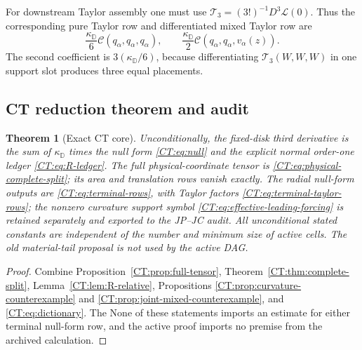 \documentclass[11pt]{amsart}
\numberwithin{equation}{section}
\newtheorem{theorem}{Theorem}[section]
\theoremstyle{definition}
\theoremstyle{remark}
\newcommand{\Cnull}{\mathcal C}
\begin{document}
For downstream Taylor assembly one must use
$\mathcal T_3=(3!)^{-1}D^3\mathcal L(0)$.  Thus the corresponding pure
Taylor row and differentiated mixed Taylor row are
\begin{equation}\label{CT:eq:terminal-taylor-rows}
 \boxed{
 \frac{\kappa_{\mathbb D}}6
   \Cnull(q_\alpha,q_\alpha,q_\alpha),
 \qquad
 \frac{\kappa_{\mathbb D}}2
   \Cnull(q_\alpha,q_\alpha,v_\alpha(z)).}
\end{equation}
The second coefficient is $3(\kappa_{\mathbb D}/6)$, because
differentiating $\mathcal T_3(W,W,W)$ in one support slot produces three
equal placements.

\subsection{CT reduction theorem and audit}

\begin{theorem}[Exact CT core]
\label{CT:thm:CT}
Unconditionally, the fixed-disk third derivative is the sum of
$\kappa_{\mathbb D}$ times the null form \eqref{CT:eq:null} and the explicit
normal order-one ledger \eqref{CT:eq:R-ledger}.  The full
physical-coordinate tensor is \eqref{CT:eq:physical-complete-split}; its area
and translation rows vanish exactly.  The radial null-form outputs are
\eqref{CT:eq:terminal-rows}, with Taylor factors
\eqref{CT:eq:terminal-taylor-rows}; the nonzero curvature support symbol
\eqref{CT:eq:effective-leading-forcing} is retained separately and exported
to the JP--JC audit.  All unconditional stated constants are independent
of the number and minimum size of active cells.  The old material-tail
proposal is not used by the active DAG.
\end{theorem}

\begin{proof}
Combine Proposition~\ref{CT:prop:full-tensor}, Theorem~\ref{CT:thm:complete-split},
Lemma~\ref{CT:lem:R-relative}, Propositions
\ref{CT:prop:curvature-counterexample} and
\ref{CT:prop:joint-mixed-counterexample}, and \eqref{CT:eq:dictionary}.  The
None of these statements imports an estimate for either terminal null-form
row, and the active proof imports no premise from the archived calculation.
\end{proof}
\end{document}
